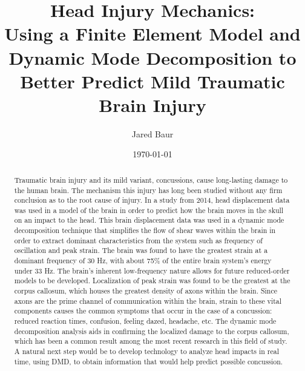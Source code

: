 \documentclass[%
 aip,
 amsmath,amssymb,
 reprint,%
 floatfix,%
]{revtex4-1}
\begin{document}

\title[]{Head Injury Mechanics:\\Using a Finite Element Model and Dynamic Mode Decomposition to Better Predict Mild Traumatic Brain Injury}

\author{Jared Baur}

\date{\today}%

\begin{abstract}
	Traumatic brain injury and its mild variant, concussions, cause long-lasting damage to the human brain. The mechanism this injury has long been studied without any firm conclusion as to the root cause of injury. In a study from 2014, head displacement data was used in a model of the brain in order to predict how the brain moves in the skull on an impact to the head. This brain displacement data was used in a dynamic mode decomposition technique that simplifies the flow of shear waves within the brain in order to extract dominant characteristics from the system such as frequency of oscillation and peak strain. The brain was found to have the greatest strain at a dominant frequency of 30 Hz, with about 75\% of the entire brain system's energy under 33 Hz. The brain's inherent low-frequency nature allows for future reduced-order models to be developed. Localization of peak strain was found to be the greatest at the corpus callosum, which houses the greatest density of axons within the brain. Since axons are the prime channel of communication within the brain, strain to these vital components causes the common symptoms that occur in the case of a concussion: reduced reaction times, confusion, feeling dazed, headache, etc. The dynamic mode decomposition analysis aids in confirming the localized damage to the corpus callosum, which has been a common result among the most recent research in this field of study. A natural next step would be to develop technology to analyze head impacts in real time, using DMD, to obtain information that would help predict possible concussion.
\end{abstract}

\maketitle
\end{document}
